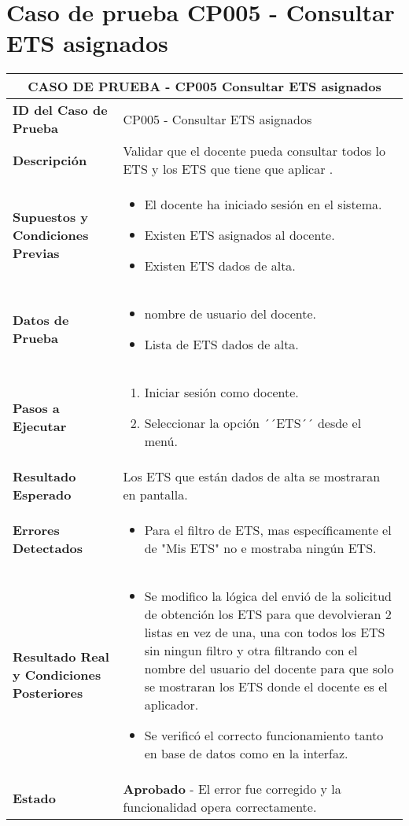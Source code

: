 \section{Caso de prueba CP005 - Consultar ETS asignados}

\begin{longtable}{|p{5cm}|p{10cm}|}
	\hline
	\multicolumn{2}{|c|}{\textbf{CASO DE PRUEBA - CP005 Consultar ETS asignados}} \\
	\hline
	\textbf{ID del Caso de Prueba} & CP005 - Consultar ETS asignados \\
	\hline
	\textbf{Descripción} & Validar que el docente pueda consultar todos lo ETS y los ETS que tiene que aplicar . \\
	\hline
	\textbf{Supuestos y Condiciones Previas} & 
	\begin{itemize}
		\item El docente ha iniciado sesión en el sistema.
		\item Existen ETS asignados al docente.
		\item Existen ETS dados de alta.
	\end{itemize} \\
	\hline
	\textbf{Datos de Prueba} & 
	\begin{itemize}
		\item nombre de usuario del docente.
		\item Lista de ETS dados de alta.
	\end{itemize} \\
	\hline
	\textbf{Pasos a Ejecutar} & 
	\begin{enumerate}
		\item Iniciar sesión como docente.
		\item Seleccionar la opción ´´ETS´´ desde el menú.
	\end{enumerate} \\
	\hline
	\textbf{Resultado Esperado} & 
	Los ETS que están dados de alta se mostraran en pantalla. \\
	\hline
	\textbf{Errores Detectados} & 
	\begin{itemize}
		\item Para el filtro de ETS, mas específicamente el de "Mis ETS" no e mostraba ningún ETS.

	\end{itemize} \\
	\hline
	\textbf{Resultado Real y Condiciones Posteriores} & 
	\begin{itemize}
		\item Se modifico la lógica del envió de la solicitud de obtención los ETS para que devolvieran 2 listas en vez de una, una con todos los ETS sin ningun filtro y otra filtrando con el nombre del usuario del docente para que solo se mostraran los ETS donde el docente es el aplicador.
		\item Se verificó el correcto funcionamiento tanto en base de datos como en la interfaz.
	\end{itemize} \\
	\hline
	\textbf{Estado} & 
	\textbf{Aprobado} - El error fue corregido y la funcionalidad opera correctamente. \\
	\hline
\end{longtable}